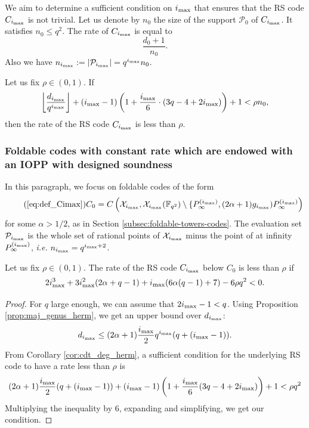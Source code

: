 \documentclass[10pt,a4paper]{article}
\newcommand\F{\mathbb{F}}
\newcommand{\size}[1]{\left|#1\right|}
\newcommand\calX{\mathcal{X}}
\newcommand\calP{\mathcal{P}}
\newcommand{\cd}{\cdot}
\newcommand{\ii}{i_{\rm{max}}}
\theoremstyle{plain}
\theoremstyle{plain}
\theoremstyle{definition}
\theoremstyle{remark}
\theoremstyle{plain}
\begin{document}
We aim to determine a sufficient condition on $\ii$ that ensures that the RS code $C_{\ii}$ is not trivial. Let us denote by $n_0$ the size of the support $\calP_0$ of $C_{\ii}$. It satisfies $n_0 \leq q^2$. The rate of $C_ {\ii}$ is equal to \[\frac{d_0+1}{n_0}.\] Also we have $n_{\ii} := \size{\calP_{\ii}} = q^{\ii}n_0$.




\begin{corollary}\label{cor:cdt_deg_herm}
	Let us fix $\rho \in (0,1)$. If
	\[ \left\lfloor \dfrac{d_{\ii}}{q^{\ii}}\right\rfloor +  (\ii-1)\left( 1+\frac{\ii}{6} \cd \left(3q-4 + 2\ii\right)\right) +1 < \rho n_0,\]
	then the rate of the RS code $C_{\ii}$ is less than $\rho$.
\end{corollary}

\subsubsection{Foldable codes with constant rate which are endowed with an IOPP with designed soundness}
In this paragraph, we focus on foldable codes of the form 
\begin{equation}\tag{\ref{eq:def_Cimax}}
	C_0= C\left(\calX_{\ii},\calX_{\ii}(\F_{q^2})\setminus \{P^{(\ii)}_{\infty} , (2\alpha+1)g_{\ii})P^{(\ii)}_{\infty}\right)
\end{equation}
for some $\alpha > 1/2$, as in Section \ref{subsec:foldable-towers-codes}. The evaluation set $\calP_{\ii}$ is the whole set of rational points of $\calX_{\ii}$ minus the point of at infinity $P_\infty^{(\ii)}$, \textit{i.e.} $n_{\ii}=q^{\ii +2}$.

\begin{proposition}
	Let us fix $\rho \in (0,1)$. The rate of the RS code $C_{\ii}$ below $C_0$ is less than $\rho$ if 
	\[2\ii^3 + 3\ii^2(2\alpha+q-1) + \ii (6\alpha(q-1)+7) - 6\rho q^2 <0.\]
\end{proposition}

\begin{proof}
	For $q$ large enough, we can assume that $2\ii-1<q$. Using Proposition \ref{prop:maj_genus_herm}, we get an upper bound over $d_{\ii}$: 
	\[ 
	d_{\ii} \leq (2\alpha+1)\dfrac{\ii}{2}q^{\ii}(q+(\ii-1)).
	\]
	From Corollary \ref{cor:cdt_deg_herm}, a sufficient condition for the underlying RS code to have a rate less than $\rho$ is    
	\[
	(2\alpha+1)\dfrac{\ii}{2}(q+(\ii-1)) + (\ii-1)\left(1+\frac{\ii}{6}(3q-4+2\ii)\right)+1 < \rho q^2
	\]    
	Multiplying the inequality by $6$, expanding and simplifying, we get our condition.
\end{proof}
\end{document}
